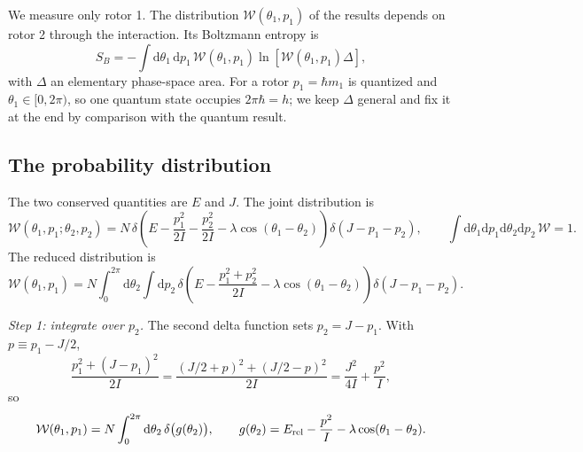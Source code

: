 \documentclass[aps,pra,onecolumn,notitlepage,nofootinbib,11pt]{revtex4-2}
\newcommand{\dd}{\mathrm{d}}
\newcommand{\Erel}{E_{\rm rel}}
\newcommand{\Wc}{\mathcal{W}}
\begin{document}
We measure only rotor 1. The distribution $\Wc(\theta_{1},p_{1})$ of the results
depends on rotor 2 through the interaction. Its Boltzmann entropy is
\begin{equation}
S_{B}=-\int\dd\theta_{1}\,\dd p_{1}\,\Wc(\theta_{1},p_{1})\ln\left[\Wc(\theta_{1},p_{1})\Delta\right],
\label{eq:SB}
\end{equation}
with $\Delta$ an elementary phase-space area. For a rotor $p_{1}=\hbar m_{1}$ is
quantized and $\theta_{1}\in[0,2\pi)$, so one quantum state occupies $2\pi\hbar=h$; we
keep $\Delta$ general and fix it at the end by comparison with the quantum result.

\subsection{The probability distribution}

The two conserved quantities are $E$ and $J$. The joint distribution is
\begin{equation}
\Wc(\theta_{1},p_{1};\theta_{2},p_{2})=N\,\delta\!\left(E-\frac{p_{1}^{2}}{2I}
-\frac{p_{2}^{2}}{2I}-\lambda\cos(\theta_{1}-\theta_{2})\right)\delta(J-p_{1}-p_{2}),
\qquad\int\dd\theta_{1}\dd p_{1}\dd\theta_{2}\dd p_{2}\,\Wc=1 .
\label{eq:Wjoint}
\end{equation}
The reduced distribution is
\begin{equation}
\Wc(\theta_{1},p_{1})=N\int_{0}^{2\pi}\dd\theta_{2}\int\dd p_{2}\,
\delta\!\left(E-\frac{p_{1}^{2}+p_{2}^{2}}{2I}-\lambda\cos(\theta_{1}-\theta_{2})\right)
\delta(J-p_{1}-p_{2}).
\end{equation}

\emph{Step 1: integrate over $p_{2}$.} The second delta function sets $p_{2}=J-p_{1}$.
With $p\equiv p_{1}-J/2$,
\begin{equation}
\frac{p_{1}^{2}+(J-p_{1})^{2}}{2I}=\frac{(J/2+p)^{2}+(J/2-p)^{2}}{2I}
=\frac{J^{2}}{4I}+\frac{p^{2}}{I},
\end{equation}
so
\begin{equation}
\Wc(\theta_{1},p_{1})=N\int_{0}^{2\pi}\dd\theta_{2}\,\delta\big(g(\theta_{2})\big),\qquad
g(\theta_{2})=\Erel-\frac{p^{2}}{I}-\lambda\cos(\theta_{1}-\theta_{2}).
\end{equation}
\end{document}
